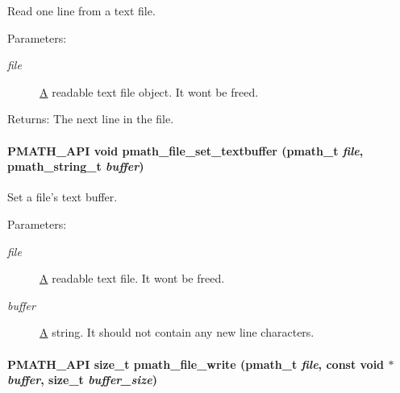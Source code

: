 Read one line from a text file. 

\begin{Desc}
\item[Parameters:]
\begin{description}
\item[{\em file}]\hyperlink{class_a}{A} readable text file object. It wont be freed. \end{description}
\end{Desc}
\begin{Desc}
\item[Returns:]The next line in the file. \end{Desc}
\hypertarget{group__file__api_g84c177ddfd1eeaa2b8b5fd5aafbf16a1}{
\paragraph[{pmath\_\-file\_\-set\_\-textbuffer}]{\setlength{\rightskip}{0pt plus 5cm}PMATH\_\-API void pmath\_\-file\_\-set\_\-textbuffer ({\bf pmath\_\-t} {\em file}, \/  {\bf pmath\_\-string\_\-t} {\em buffer})}\hfill}
\label{group__file__api_g84c177ddfd1eeaa2b8b5fd5aafbf16a1}


Set a file's text buffer. 

\begin{Desc}
\item[Parameters:]
\begin{description}
\item[{\em file}]\hyperlink{class_a}{A} readable text file. It wont be freed. \item[{\em buffer}]\hyperlink{class_a}{A} string. It should not contain any new line characters. \end{description}
\end{Desc}
\hypertarget{group__file__api_g085f074227d8d7ed82c0fba82fa43109}{
\paragraph[{pmath\_\-file\_\-write}]{\setlength{\rightskip}{0pt plus 5cm}PMATH\_\-API size\_\-t pmath\_\-file\_\-write ({\bf pmath\_\-t} {\em file}, \/  const void $\ast$ {\em buffer}, \/  size\_\-t {\em buffer\_\-size})}\hfill}
\label{group__file__api_g085f074227d8d7ed82c0fba82fa43109}


